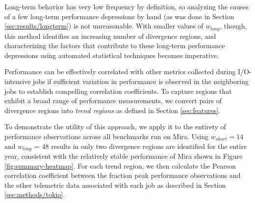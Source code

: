 Long-term behavior has very low frequency by definition, so analyzing the causes of a few long-term performance depressions by hand (as was done in Section \ref{sec:results/longterm}) is not unreasonable.
With smaller values of $w_{long}$, though, this method identifies an increasing number of divergence regions, and characterizing the factors that contribute to these long-term performance depressions using automated statistical techniques becomes imperative.

Performance can be effectively correlated with other metrics collected during I/O-intensive jobs if sufficient variation in performance is observed in the neighboring jobs to establish compelling correlation coefficients.
To capture regions that exhibit a broad range of performance measurements, we convert pairs of divergence regions into \emph{trend regions} as defined in Section \ref{sec:features}.
%
%

To demonstrate the utility of this approach, we apply it to the entirety of performance observations across all benchmarks run on Mira.
{\color{red}Using $w_{short} = 14$ and $w_{long}$ = 48 results in only two divergence regions are identified for the entire year}, consistent with the relatively stable performance of Mira shown in Figure \ref{fig:summary-heatmap}.
For each trend region, we then calculate the Pearson correlation coefficient between the fraction peak performance observations and the other telemetric data associated with each job as described in Section \ref{sec:methods/tokio}.


